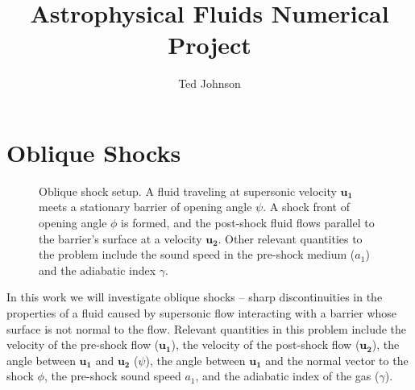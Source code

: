 \documentclass[twocolumn]{aastex631}
\begin{document}
\title{Astrophysical Fluids Numerical Project}

\author{Ted Johnson}


\section{Oblique Shocks}
\label{sec:intro}
\begin{figure}
    \centering
    \caption{Oblique shock setup. A fluid traveling at supersonic velocity $\bm{u_1}$ meets a stationary barrier of opening angle $\psi$. A shock front of opening angle $\phi$ is formed, and the post-shock fluid flows parallel to the barrier's surface at a velocity $\bm{u_2}$. Other relevant quantities to the problem include the sound speed in the pre-shock medium ($a_1$) and the adiabatic index $\gamma$.}
    \label{fig:setup}
\end{figure}
In this work we will investigate oblique shocks -- sharp discontinuities in the properties of a fluid caused by supersonic flow interacting with a barrier whose surface is not normal to the flow. Relevant quantities in this problem include the velocity of the pre-shock flow ($\bm{u_1}$), the velocity of the post-shock flow ($\bm{u_2}$), the angle between $\bm{u_1}$ and $\bm{u_2}$ ($\psi$), the angle between $\bm{u_1}$ and the normal vector to the shock $\phi$, the pre-shock sound speed $a_1$, and the adiabatic index of the gas ($\gamma$).
\end{document}
